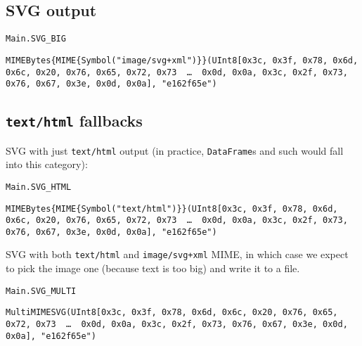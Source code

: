 \subsection{SVG output}



\label{7074750330941949804}{}



\begin{lstlisting}[]
Main.SVG_BIG
\end{lstlisting}


\begin{lstlisting}[]
MIMEBytes{MIME{Symbol("image/svg+xml")}}(UInt8[0x3c, 0x3f, 0x78, 0x6d, 0x6c, 0x20, 0x76, 0x65, 0x72, 0x73  …  0x0d, 0x0a, 0x3c, 0x2f, 0x73, 0x76, 0x67, 0x3e, 0x0d, 0x0a], "e162f65e")
\end{lstlisting}



\subsection{\texttt{text/html} fallbacks}



\label{8096659708007340917}{}


SVG with just \texttt{text/html} output (in practice, \texttt{DataFrame}s and such would fall into this category):




\begin{lstlisting}[]
Main.SVG_HTML
\end{lstlisting}


\begin{lstlisting}[]
MIMEBytes{MIME{Symbol("text/html")}}(UInt8[0x3c, 0x3f, 0x78, 0x6d, 0x6c, 0x20, 0x76, 0x65, 0x72, 0x73  …  0x0d, 0x0a, 0x3c, 0x2f, 0x73, 0x76, 0x67, 0x3e, 0x0d, 0x0a], "e162f65e")
\end{lstlisting}



SVG with both \texttt{text/html} and \texttt{image/svg+xml} MIME, in which case we expect to pick the image one (because text is too big) and write it to a file.




\begin{lstlisting}[]
Main.SVG_MULTI
\end{lstlisting}


\begin{lstlisting}[]
MultiMIMESVG(UInt8[0x3c, 0x3f, 0x78, 0x6d, 0x6c, 0x20, 0x76, 0x65, 0x72, 0x73  …  0x0d, 0x0a, 0x3c, 0x2f, 0x73, 0x76, 0x67, 0x3e, 0x0d, 0x0a], "e162f65e")
\end{lstlisting}



